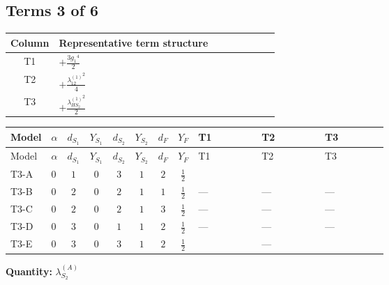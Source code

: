 \documentclass[8pt]{article}
\begin{document}
\begin{landscape}
\subsection*{Terms 3 of 6}
\begin{center}
\begin{tabular}{@{}c >{\raggedright\arraybackslash}p{0.82\linewidth}@{}}
\toprule
Column & Representative term structure \\
\midrule
T1 & \(\displaystyle +\frac{3 {g_1}^4}{2}\) \\
\midrule
T2 & \(\displaystyle +\frac{{\lambda_{12}^{(1)}}^2}{4}\) \\
\midrule
T3 & \(\displaystyle +\frac{{\lambda_{HS_2}^{(1)}}^2}{2}\) \\
\midrule
\bottomrule
\end{tabular}
\end{center}
\smallskip
\tiny
\begin{longtable}{@{}llcccccc >{\raggedright\arraybackslash}p{0.21\linewidth} >{\raggedright\arraybackslash}p{0.21\linewidth} >{\raggedright\arraybackslash}p{0.21\linewidth}@{}}
\toprule
Model & $\alpha$ & $d_{S_1}$ & $Y_{S_1}$ & $d_{S_2}$ & $Y_{S_2}$ & $d_F$ & $Y_F$ & T1 & T2 & T3 \\
\midrule
\endfirsthead
\toprule
Model & $\alpha$ & $d_{S_1}$ & $Y_{S_1}$ & $d_{S_2}$ & $Y_{S_2}$ & $d_F$ & $Y_F$ & T1 & T2 & T3 \\
\midrule
\endhead
T3-A & $0$ & $1$ & $0$ & $3$ & $1$ & $2$ & $\frac{1}{2}$ & \scriptsize\adjustbox{max width=\linewidth}{$\begin{gathered} +\frac{3 {g_1}^4}{2}\end{gathered}$} & \scriptsize\adjustbox{max width=\linewidth}{$\begin{gathered} +\frac{{\lambda_{12}^{(1)}}^2}{4}\end{gathered}$} & \scriptsize\adjustbox{max width=\linewidth}{$\begin{gathered} +\frac{{\lambda_{HS_2}^{(1)}}^2}{2}\end{gathered}$} \\
\midrule
T3-B & $0$ & $2$ & $0$ & $2$ & $1$ & $1$ & $\frac{1}{2}$ & --- & --- & --- \\
\midrule
T3-C & $0$ & $2$ & $0$ & $2$ & $1$ & $3$ & $\frac{1}{2}$ & --- & --- & --- \\
\midrule
T3-D & $0$ & $3$ & $0$ & $1$ & $1$ & $2$ & $\frac{1}{2}$ & --- & --- & --- \\
\midrule
T3-E & $0$ & $3$ & $0$ & $3$ & $1$ & $2$ & $\frac{1}{2}$ & \scriptsize\adjustbox{max width=\linewidth}{$\begin{gathered} +\frac{3 {g_1}^4}{2}\end{gathered}$} & --- & \scriptsize\adjustbox{max width=\linewidth}{$\begin{gathered} +\frac{{\lambda_{HS_2}^{(1)}}^2}{2}\end{gathered}$} \\
\midrule
\bottomrule
\end{longtable}
\clearpage
\noindent\textbf{Quantity: }$\lambda_{S_2}^{(A)}$\par\smallskip

\end{landscape}
\end{document}
